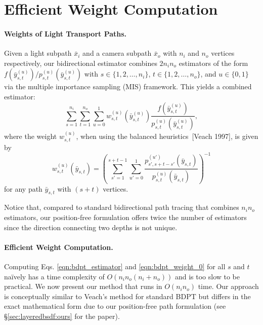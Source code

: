 \section{Efficient Weight Computation}
\label{sec:layeredbsdf:weight_computation}


\paragraph{Weights of Light Transport Paths.}

Given a light subpath $\bar{x}_i$ and a camera subpath $\bar{x}_o$ with $n_i$ and $n_o$ vertices respectively, our bidirectional estimator combines $2 n_i n_o$ estimators of the form $f(\bar{y}^{(u)}_{s,t})/p^{(u)}_{s,t}(\bar{y}^{(u)}_{s,t})$ with $s \in \{1, 2, \ldots, n_i\}$, $t \in \{1, 2, \ldots, n_o\}$, and $u \in \{0, 1\}$ via the multiple importance sampling (MIS) framework.
This yields a combined estimator:
\begin{equation}
\label{eqn:bdpt_estimator}
\sum_{s = 1}^{n_i} \sum_{t = 1}^{n_o} \sum_{u = 0}^1 w^{(u)}_{s, t}(\bar{y}^{(u)}_{s,t}) \frac{f(\bar{y}^{(u)}_{s,t})}{p^{(u)}_{s,t}(\bar{y}^{(u)}_{s,t})},
\end{equation}
where the weight $w^{(u)}_{s, t}$, when using the balanced heuristics~[Veach 1997], is given by
\begin{equation}
\label{eqn:bdpt_weight_0}
w^{(u)}_{s, t}(\bar{y}_{s,t})
= \left(\sum_{s' = 1}^{s + t - 1} \sum_{u'=0}^1 \frac{p^{(u')}_{s', s + t - s'}(\bar{y}_{s,t})}{p^{(u)}_{s,t}(\bar{y}_{s,t})}\right)^{-1}
\end{equation}
for any path $\bar{y}_{s,t}$ with $(s + t)$ vertices.

Notice that, compared to standard bidirectional path tracing that combines $n_i n_o$ estimators, our position-free formulation offers twice the number of estimators since the direction connecting two depths is not unique.


\paragraph{Efficient Weight Computation.}

Computing Eqs. \eqref{eqn:bdpt_estimator} and \eqref{eqn:bdpt_weight_0} for all $s$ and $t$ na\"ively has a time complexity of $O(n_i n_o (n_i + n_o))$ and is too slow to be practical.
We now present our method that runs in $O(n_i n_o)$ time.
Our approach is conceptually similar to Veach's method for standard BDPT but differs in the exact mathematical form due to our position-free path formulation (see \S\ref{sec:layeredbsdf:ours} for the paper).

